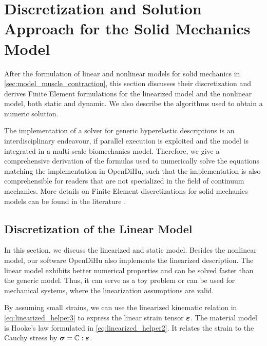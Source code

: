 
\section{Discretization and Solution Approach for the Solid Mechanics Model }\label{sec:discretization_mechanics}

After the formulation of linear and nonlinear models for solid mechanics in \cref{sec:model_muscle_contraction}, this section discusses their discretization and derives Finite Element formulations for the linearized model and the nonlinear model, both static and dynamic.
We also describe the algorithms used to obtain a numeric solution.

The implementation of a solver for generic hyperelastic descriptions is an interdisciplinary endeavour, if parallel execution is exploited and the model is integrated in a multi-scale biomechanics model.
Therefore, we give a comprehensive derivation of the formulas used to numerically solve the equations matching the implementation in OpenDiHu, such that the implementation is also comprehensible for readers that are not specialized in the field of continuum mechanics. More details on Finite Element discretizations for solid mechanics models can be found in the literature \cite{zienkiewicz1977finite,SUSSMAN1987357,zienkiewicz2005finite}.

\subsection{Discretization of the Linear Model}\label{sec:linearized_mechanics_model}

In this section, we discuss the linearized and static model. Besides the nonlinear model, our software OpenDiHu also implements the linearized description. The linear model exhibits better numerical properties and can be solved faster than the generic model. Thus, it can serve as a toy problem or can be used for mechanical systems, where the linearization assumptions are valid.

By assuming small strains, we can use the linearized kinematic relation in \cref{eq:linearized_helper3} to express the linear strain tensor $\boldsymbol{\varepsilon}$. The material model is Hooke's law formulated in \cref{eq:linearized_helper2}. It relates the strain to the Cauchy stress by $\boldsymbol{\sigma} = \mathbb{C}:\boldsymbol{\varepsilon}$.


